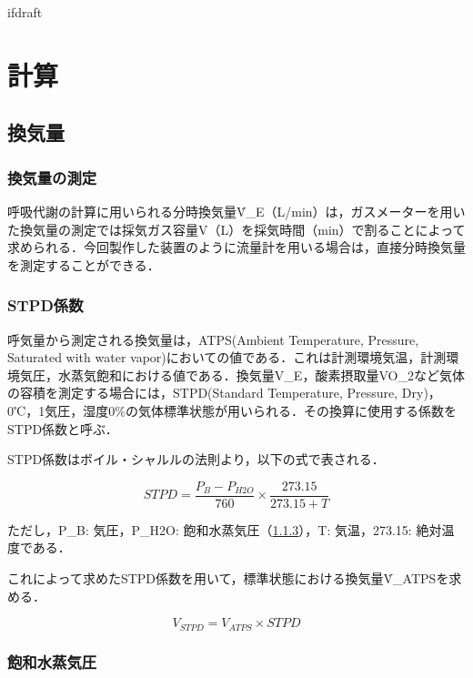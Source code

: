 \expandafter\ifx\csname ifdraft\endcsname\relax
 
\fi

\section{計算}

\subsection{換気量}

\subsubsection{換気量の測定}

呼吸代謝の計算に用いられる分時換気量\.{V}_E（L/min）は，ガスメーターを用いた換気量の測定では採気ガス容量V（L）を採気時間（min）で割ることによって求められる．今回製作した装置のように流量計を用いる場合は，直接分時換気量を測定することができる．

\subsubsection{STPD係数}
\label{sec:stpd}

呼気量から測定される換気量は，ATPS(Ambient Temperature, Pressure, Saturated with water vapor)においての値である．これは計測環境気温，計測環境気圧，水蒸気飽和における値である．換気量V_E，酸素摂取量VO_2など気体の容積を測定する場合には，STPD(Standard Temperature, Pressure, Dry)，0℃，1気圧，湿度0\%の気体標準状態が用いられる．その換算に使用する係数をSTPD係数と呼ぶ．

STPD係数はボイル・シャルルの法則より，以下の式で表される．

\begin{equation}
  \label{eq:stpd}
  STPD = \frac{P_B - P_{H2O}}{760} \times　\frac{273.15}{273.15 + T}
\end{equation}

ただし，P_B: 気圧，P_{H2O}: 飽和水蒸気圧（\ref{sec:swvp}），T: 気温，273.15: 絶対温度である．

これによって求めたSTPD係数を用いて，標準状態における換気量\.{V}_{ATPS}を求める．

\begin{equation}
  V_{STPD} = V_{ATPS} \times STPD
\end{equation}

\subsubsection{飽和水蒸気圧}
\label{sec:swvp}


